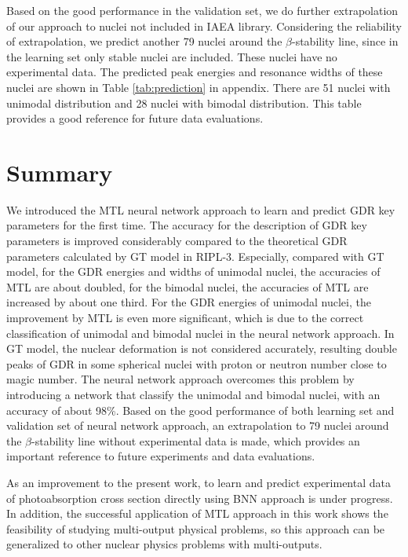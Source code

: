 \documentclass[twocolumn,showpacs,superscriptaddress,amsmath,amssymb,prc,preprintnumbers]{revtex4-1}
\begin{document}
Based on the good performance in the validation set, we do further extrapolation of our approach to nuclei not included in IAEA library. Considering the reliability of extrapolation, we predict another 79 nuclei around the $\beta$-stability line, since in the learning set only stable nuclei are included.  These nuclei have no experimental data. The predicted peak energies and resonance widths of these nuclei are shown in Table \ref{tab:prediction} in appendix. There are 51 nuclei with unimodal distribution and 28 nuclei with bimodal distribution. This table provides a good reference for future data evaluations.


\section{Summary}

We introduced the MTL neural network approach to learn and predict GDR key parameters for the first time. The accuracy for the description of GDR key parameters is improved considerably compared to the theoretical GDR parameters calculated by GT model in RIPL-3. Especially, compared with GT model, for the GDR energies and widths of unimodal nuclei, the accuracies of MTL are about doubled,  for the bimodal nuclei, the accuracies of MTL are increased by about one third.  For the GDR energies of unimodal nuclei, the improvement by MTL is even more significant, which is due to the correct classification of unimodal and bimodal nuclei in the neural network approach. In GT model, the nuclear deformation is not considered accurately, resulting double peaks of GDR in some spherical nuclei with proton or neutron number close to magic number. The neural network approach overcomes this problem by introducing a network that classify the unimodal and bimodal nuclei, with an accuracy of about 98\%. Based on the good performance of both learning set and validation set of neural network approach, an extrapolation to 79 nuclei around the $\beta$-stability line without experimental data is made, which provides an important reference to future experiments and data evaluations.

As an improvement to the present work, to learn and predict experimental data of photoabsorption cross section directly using BNN approach is under progress.
In addition, the successful application of MTL approach in this work shows the feasibility of studying multi-output physical problems, so this approach can be generalized to other nuclear physics problems with multi-outputs.
\end{document}
